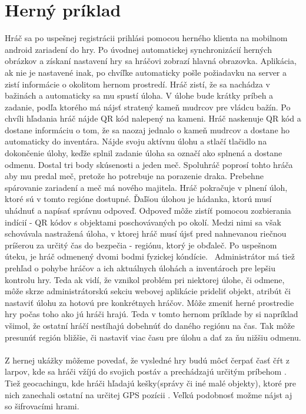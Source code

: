 \section{Herný príklad}
Hráč sa po uspešnej registrácii prihlási pomocou herného klienta na mobilnom android zariadení do hry. Po úvodnej automatickej synchronizácií herných obrázkov a získaní nastavení hry sa hráčovi zobrazí hlavná obrazovka. Aplikácia, ak nie je nastavené inak, po chvíľke automaticky pošle požiadavku na server a zistí informácie o okolitom hernom prostredí. Hráč zistí, že sa nachádza v bažinách a automaticky  sa mu spustí úloha. V úlohe bude krátky príbeh a zadanie, podľa ktorého má nájsť stratený kameň mudrcov pre vládcu bažín. Po chvíli hľadania hráč nájde QR kód nalepený na kameni. Hráč naskenuje QR kód a dostane informáciu o tom, že sa naozaj jednalo o kameň mudrcov a dostane ho automaticky do inventára. Nájde svoju aktívnu úlohu a stlačí tlačidlo na dokončenie úlohy, keďže splnil zadanie úloha sa označí ako splnená a dostane odmenu. Dostal tri body skúsenosti a jeden meč. Spoluhráč poprosí tohto hráča aby mu predal meč, pretože ho potrebuje na porazenie draka. Prebehne spárovanie zariadení a meč má nového majitela. Hráč pokračuje v plnení úloh, ktoré sú v tomto regióne dostupné. Ďaľšou úlohou je hádanka, ktorú musí uhádnuť a napísať správnu odpoveď. Odpoveď môže zistíť pomocou zozbierania indícií - QR kódov s objektami poschovávaných po okolí. Medzi nimi sa však schovávala nastražená úloha, v ktorej hráč musí újsť pred nahnevanou riečnou príšerou za určitý čas do bezpečia - regiónu, ktorý je obďaleč. Po uspešnom úteku, je hráč odmenený dvomi bodmi fyzickej kóndície. \
Administrátor má tiež prehľad o pohybe hráčov a ich aktuálnych úlohách a inventároch pre lepšiu kontrolu hry. Teda ak vidí, že vznikol problém pri niektorej úlohe, či odmene, môže skrze administrátorskú sekciu webovej aplikácie prideliť objekt, atribút či nastaviť úlohu za hotovú pre konkrétnych hráčov. Môže zmeniť herné prostredie hry počas toho ako jú hráči hrajú. Teda v tomto hernom príklade by si napríklad všimol, že ostatní hráčí nestíhajú dobehnúť do daného regiónu na čas. Tak môže presunúť región bližšie, či nastaviť viac času pre úlohu a dať za ňu nižšiu odmenu.

\paragraph{}
Z hernej ukážky môžeme povedať, že vysledné hry budú môcť čerpať časť čŕt z larpov, kde sa hráči vžíjú do svojich postáv a prechádzajú určitým príbehom \cite{larp-cojeto}. Tiež geocachingu, kde hráči hľadajú kešky(správy či iné malé objekty), ktoré pre nich zanechali ostatní na určitej GPS pozícii \cite{geocaching}. Veľkú podobnosť možme nájst aj so šifrovacími hrami. 

